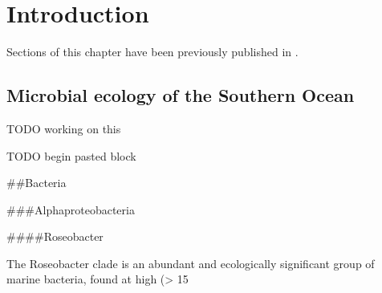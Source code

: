 \chapter{Introduction} 
\label{ch:intro}

Sections of this chapter have been previously published in .

\section{Microbial ecology of the Southern Ocean}
TODO working on this

TODO begin pasted block

##Bacteria

###Alphaproteobacteria

####Roseobacter

The Roseobacter clade is an abundant and ecologically significant group of marine bacteria, found at high (> 15%

